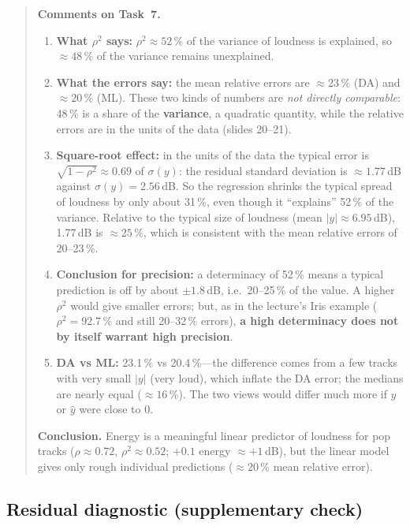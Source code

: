 \documentclass[11pt,letterpaper]{article}
\newenvironment{taskcomments}[1][Comments]{%
  \par\medskip\noindent
  \begin{quote}\small\textbf{#1.}\enspace\ignorespaces
}{%
  \end{quote}\medskip
}
\begin{document}
\begin{taskcomments}[Comments on Task~7]
\begin{enumerate}
  \item \textbf{What $\rho^2$ says:} $\rho^2 \approx 52\,\%$ of the variance
        of loudness is explained, so $\approx 48\,\%$ of the variance remains
        unexplained.
  \item \textbf{What the errors say:} the mean relative errors are $\approx
        23\,\%$ (DA) and $\approx 20\,\%$ (ML). These two kinds of numbers are
        \emph{not directly comparable}: 48\,\% is a share of the
        \textbf{variance}, a quadratic quantity, while the relative errors are
        in the units of the data (slides 20--21).
  \item \textbf{Square-root effect:} in the units of the data the typical
        error is $\sqrt{1-\rho^2}\approx 0.69$ of $\sigma(y)$: the residual
        standard deviation is $\approx 1.77$\,dB against $\sigma(y) = 2.56$\,dB.
        So the regression shrinks the typical spread of loudness by only about
        31\,\%, even though it ``explains'' 52\,\% of the variance. Relative
        to the typical size of loudness (mean $|y| \approx 6.95$\,dB), 1.77\,dB
        is $\approx 25\,\%$, which is consistent with the mean relative errors
        of 20--23\,\%.
  \item \textbf{Conclusion for precision:} a determinacy of 52\,\% means a
        typical prediction is off by about $\pm1.8$\,dB, i.e.\ 20--25\,\% of
        the value. A higher $\rho^2$ would give smaller errors; but, as in the
        lecture's Iris example ($\rho^2 = 92.7\,\%$ and still 20--32\,\%
        errors), \textbf{a high determinacy does not by itself warrant high
        precision}.
  \item \textbf{DA vs ML:} 23.1\,\% vs 20.4\,\%---the difference comes from a
        few tracks with very small $|y|$ (very loud), which inflate the DA
        error; the medians are nearly equal ($\approx 16\,\%$). The two views
        would differ much more if $y$ or $\hat y$ were close to 0.
\end{enumerate}
\textbf{Conclusion.} Energy is a meaningful linear predictor of loudness for
pop tracks ($\rho \approx 0.72$, $\rho^2 \approx 0.52$; $+0.1$ energy $\approx
+1$\,dB), but the linear model gives only rough individual predictions
($\approx 20\,\%$ mean relative error).
\end{taskcomments}

\subsection{Residual diagnostic (supplementary check)}\label{sec:a1res}
\end{document}
